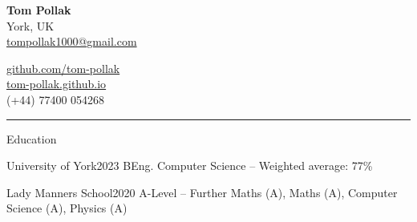 \documentclass{structure}
\begin{document}
\parbox{0.5\textwidth}{
    {\namesize\bf{Tom Pollak}} \\[6pt]
    York, UK\\
    \href{mailto:tompollak1000@gmail.com}{tompollak1000@gmail.com}
}
\hfill
\parbox{0.5\textwidth}{
    \vspace*{10pt}

    \begin{flushright}

        \href{https://github.com/tom-pollak}{github.com/tom-pollak} \\
        \href{https://tom-pollak.github.io}{tom-pollak.github.io} \\
        (+44) 77400 054268
    \end{flushright}

}

\smallskip
\hrule
\smallskip


\begin{rSection}{Education}

    \begin{rSubsectionNoList}{University of York}{2023}{
            BEng. Computer Science -- Weighted average: 77\%
        }{}{}
    \end{rSubsectionNoList}

    \begin{rSubsectionNoList}{Lady Manners School}{2020}{
            A-Level --  Further Maths (A), Maths (A), Computer Science (A), Physics (A)
        }{}{}
    \end{rSubsectionNoList}

\end{rSection}

\end{document}

